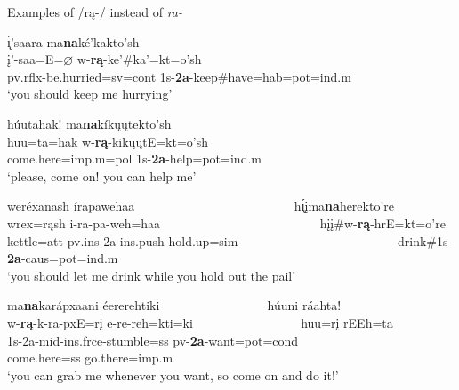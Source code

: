 \begin{exe}
\item\label{na2A} Examples of /rą-/ instead of \textit{ra-}

	\begin{xlist}
	
	\item \glll \'{ı̨}'saara ma\textbf{na}ké'kakto'sh\\
	į'-saa=E=$\varnothing$ w-\textbf{rą}-ke'\#ka'=kt=o'sh\\
	pv.rflx-\textnormal{be.hurried}=sv=cont 1s-\textbf{2a}-\textnormal{keep}\#\textnormal{have}=hab=pot=ind.m\\
	\glt `you should keep me hurrying' \citep[223]{hollow1973a}
	
	\item \glll húutahak! ma\textbf{na}kíkųųtekto'sh\\
	huu=ta=hak w-\textbf{rą}-kikųųtE=kt=o'sh\\
	\textnormal{come.here}=imp.m=pol 1s-\textbf{2a}-\textnormal{help}=pot=ind.m\\
	\glt `please, come on! you can help me' \citep[41]{hollow1973a}
	
	\item \glll weréxanash írapawehaa ~ ~ ~ ~ ~ ~ ~ ~ ~ ~ ~ ~ ~ ~ ~ h\'{ı̨}įma\textbf{na}herekto're\\
	wrex=rąsh i-ra-pa-weh=haa ~ ~ ~ ~ ~ ~ ~ ~ ~ ~ ~ ~ ~ ~ ~  hįį\#w-\textbf{rą}-hrE=kt=o're\\
	\textnormal{kettle}=att pv.ins-2a-ins.push-\textnormal{hold.up}=sim ~ ~ ~ ~ ~ ~ ~ ~ ~ ~ ~ ~ ~ ~ ~ \textnormal{drink}\#1s-\textbf{2a}-caus=pot=ind.m\\
	\glt `you should let me drink while you hold out the pail' \citep[131]{hollow1973a}
	
	\item \glll ma\textbf{na}karápxaani éererehtiki ~ ~ ~ ~ ~ ~ ~ ~ ~ ~ húuni ráahta!\\
	w-\textbf{rą}-k-ra-pxE=rį e-re-reh=kti=ki ~ ~ ~ ~ ~ ~ ~ ~ ~ ~ huu=rį rEEh=ta\\
	1s-2a-mid-ins.frce-\textnormal{stumble}=ss pv-\textbf{2a}-\textnormal{want}=pot=cond ~ ~ ~ ~ ~ ~ ~ ~ ~ ~ \textnormal{come.here}=ss \textnormal{go.there}=imp.m\\
	\glt `you can grab me whenever you want, so come on and do it!' \citep[159]{hollow1973b}
	
	\end{xlist}

\end{exe}

